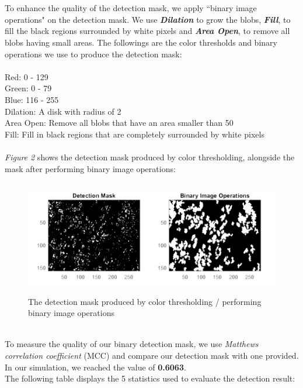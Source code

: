 \documentclass[a4paper,11pt]{article}
\newcommand\tab[1][4mm]{\hspace*{#1}}
\begin{document}
 \\\\
To enhance the quality of the detection mask, we apply ``binary image operations" on the detection mask. We use \textbf{\emph{Dilation}} to grow the blobs, \textbf{\emph{Fill}}, to fill the black regions surrounded by white pixels and \textbf{\emph{Area Open}}, to remove all blobs having small areas. The followings are the color thresholds and binary operations we use to produce the detection mask: \\\\
\tab Red: 0 - 129 \\
\tab Green: 0 - 79 \\
\tab Blue: 116 - 255 \\
\tab Dilation: A disk with radius of 2 \\
\tab Area Open: Remove all blobs that have an area smaller than 50 \\
\tab Fill:  Fill in black regions that are completely surrounded by white pixels \\

 \\
\emph{Figure 2} shows the detection mask produced by color thresholding, alongside the mask after performing binary image operations:

\begin{figure}[!htb]
  \centering
  \includegraphics[width=14cm, height=5cm]{2.png}
  \caption{\small The detection mask produced by color thresholding / performing binary image operations}
\end{figure}

\newpage
 \\To measure the quality of our binary detection mask, we use \emph{Matthews correlation coefficient} (MCC) and compare our detection mask with one provided. In our simulation, we reached the value of \textbf{0.6063}. \\
The following table displays the 5 statistics used to evaluate the detection result:
\end{document}
